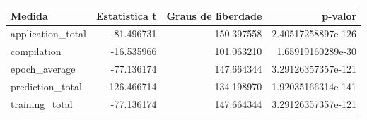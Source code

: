 \begin{tabular}{lrrr}
\hline
Medida & Estatistica t & Graus de liberdade & p-valor \\
\hline
application\_total & -81.496731 & 150.397558 & 2.40517258897e-126 \\
compilation & -16.535966 & 101.063210 & 1.65919160289e-30 \\
epoch\_average & -77.136174 & 147.664344 & 3.29126357357e-121 \\
prediction\_total & -126.466714 & 134.198970 & 1.92035166314e-141 \\
training\_total & -77.136174 & 147.664344 & 3.29126357357e-121 \\
\hline
\end{tabular}
